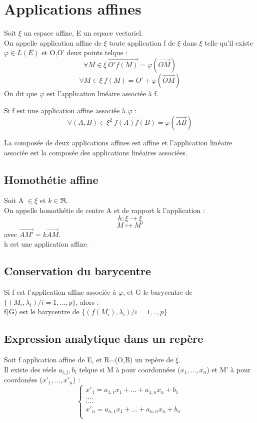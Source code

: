 \section{Applications affines}
\begin{de}
Soit $\xi$ un espace affine, E un espace vectoriel.\\
On appelle application affine de $\xi$ toute application f de $\xi$ dans $\xi$ telle qu'il existe $\varphi \in L(E)$ et O,O' deux points telque :
$$\forall M \in \xi~ \overrightarrow{O'f(M)} = \varphi(\overrightarrow{OM})$$
$$\forall M \in \xi~ f(M) = O'+\varphi(\overrightarrow{OM})$$
On dit que $\varphi$ est l'application linéaire associée à f.
\end{de}
\begin{prop}
Si f est une application affine associée à $\varphi$ : 
$$\forall (A,B) \in \xi^2~ \overrightarrow{f(A)f(B)} = \varphi(\overrightarrow{AB})$$
\end{prop}
\begin{prop}
 La composée de deux applications affines est affine et l'application linéaire associée est la composée des applications linéaires associées.
\end{prop}
\subsection{Homothétie affine}
\begin{de}
Soit A $\in \xi$ et $k \in \Re$.\\
On appelle homothétie de centre A et de rapport k l'application :
$$h : \xi \rightarrow \xi$$
$$M \mapsto M'$$
avec $\overrightarrow{AM'} = k\overrightarrow{AM}$.\\
h est une application affine.
\end{de}
\subsection{Conservation du barycentre}
\begin{prop}
Si f est l'application affine associée à $\varphi$, et G le barycentre de $\{(M_i,\lambda_i)/ i=1,...,p\}$, alors :\\
f(G) est le barycentre de $\{(f(M_i),\lambda_i)/i=1,..,p\}$
\end{prop}
\subsection{Expression analytique dans un repère}
\begin{de}
Soit f application affine de E, et R=(O,B) un repère de $\xi$.\\
Il existe des réels $a_{i,j},b_i$ telque si M à pour coordonnées ($x_1,...,x_n$) et M' à pour coordonées ($x'_1,...,x'_n$) :
\[\left\{\begin{array}{l}
   x'_1 = a_{1,1}x_1+...+a_{1,n}x_n+b_1  \\
   ....\\
   ....\\
   x'_n = a_{n,1}x_1+...+a_{n,n}x_n+b_n\\
  \end{array}\right.\]
\end{de}
